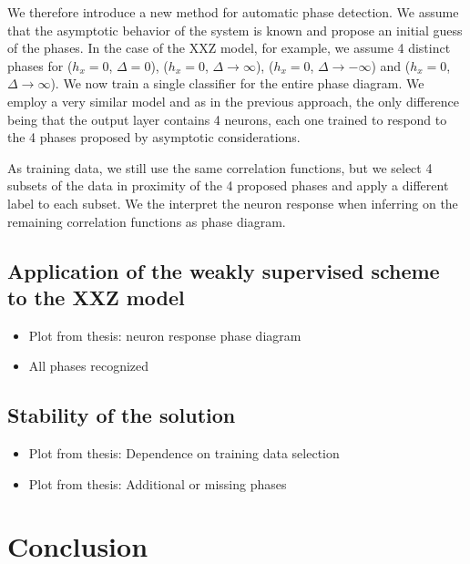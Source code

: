 \documentclass[prl, reprint, twocolumn]{revtex4-1}
\begin{document}
	We therefore introduce a new method for automatic phase detection. We assume that the asymptotic behavior of the system is known and propose an initial guess of the phases. In the case of the XXZ model, for example, we assume 4 distinct phases for ($h_x=0$, $\Delta=0$), ($h_x=0$, $\Delta\rightarrow\infty$), ($h_x=0$, $\Delta\rightarrow -\infty$) and ($h_x=0$, $\Delta\rightarrow\infty$). We now train a single classifier for the entire phase diagram. We employ a very similar model and as in the previous approach, the only difference being that the output layer contains 4 neurons, each one trained to respond to the 4 phases proposed by asymptotic considerations.
	
	As training data, we still use the same correlation functions, but we select 4 subsets of the data in proximity of the 4 proposed phases and apply a different label to each subset. We the interpret the neuron response when inferring on the remaining correlation functions as phase diagram. 
	
	
	
	\subsection{Application of the weakly supervised scheme \\ to the XXZ model}
	\begin{itemize}
		\item Plot from thesis: neuron response phase diagram
		\item All phases recognized
	\end{itemize}
	\blindtext[4]
	
	\subsection{Stability of the solution}
	\begin{itemize}
		\item Plot from thesis: Dependence on training data selection
		\item Plot from thesis: Additional or missing phases
	\end{itemize}
	\blindtext[3]
	
	\section{Conclusion}
	\blindtext[3]
	
	
	
	
	
\end{document}
